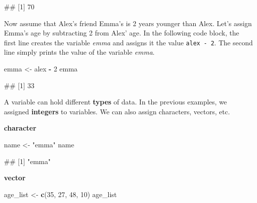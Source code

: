 \documentclass[
]{book}
\newenvironment{Shaded}{\begin{snugshade}}{\end{snugshade}}
\newcommand{\DecValTok}[1]{\textcolor[rgb]{0.00,0.00,0.81}{#1}}
\newcommand{\FunctionTok}[1]{\textcolor[rgb]{0.13,0.29,0.53}{\textbf{#1}}}
\newcommand{\NormalTok}[1]{#1}
\newcommand{\OtherTok}[1]{\textcolor[rgb]{0.56,0.35,0.01}{#1}}
\newcommand{\SpecialCharTok}[1]{\textcolor[rgb]{0.81,0.36,0.00}{\textbf{#1}}}
\newcommand{\StringTok}[1]{\textcolor[rgb]{0.31,0.60,0.02}{#1}}
\begin{document}
\begin{Shaded}
\begin{Highlighting}[]
\NormalTok{\#\# [1] 70}
\end{Highlighting}
\end{Shaded}

Now assume that Alex's friend Emma's is 2 years younger than Alex. Let's assign Emma's age by subtracting 2 from Alex' age. In the following code block, the first line creates the variable \emph{emma} and assigns it the value \texttt{alex\ -\ 2}. The second line simply prints the value of the variable \emph{emma}.

\begin{Shaded}
\begin{Highlighting}[]
\NormalTok{emma }\OtherTok{\textless{}{-}}\NormalTok{ alex }\SpecialCharTok{{-}} \DecValTok{2}
\NormalTok{emma}
\end{Highlighting}
\end{Shaded}

\begin{Shaded}
\begin{Highlighting}[]
\NormalTok{\#\# [1] 33}
\end{Highlighting}
\end{Shaded}

A variable can hold different \textbf{types} of data. In the previous examples, we assigned \textbf{integers} to variables. We can also assign characters, vectors, etc.

\textbf{character}

\begin{Shaded}
\begin{Highlighting}[]
\NormalTok{name }\OtherTok{\textless{}{-}} \StringTok{"emma"}
\NormalTok{name}
\end{Highlighting}
\end{Shaded}

\begin{Shaded}
\begin{Highlighting}[]
\NormalTok{\#\# [1] "emma"}
\end{Highlighting}
\end{Shaded}

\textbf{vector}

\begin{Shaded}
\begin{Highlighting}[]
\NormalTok{age\_list }\OtherTok{\textless{}{-}} \FunctionTok{c}\NormalTok{(}\DecValTok{35}\NormalTok{, }\DecValTok{27}\NormalTok{, }\DecValTok{48}\NormalTok{, }\DecValTok{10}\NormalTok{)}
\NormalTok{age\_list}
\end{Highlighting}
\end{Shaded}
\end{document}
